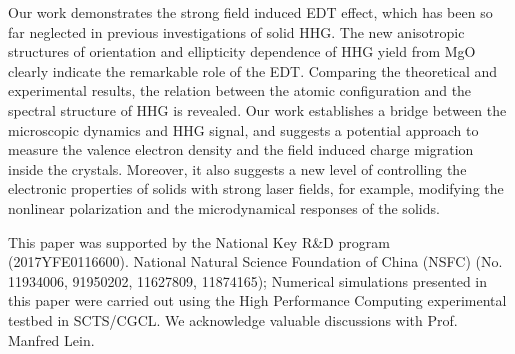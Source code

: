 \documentclass[aps,prl,10pt,preprint,nofootinbib]{revtex4-1}
\begin{document}
Our work demonstrates the strong field induced EDT effect, which has been so far neglected in previous investigations of solid HHG. The new anisotropic structures of orientation and ellipticity dependence of HHG yield from MgO clearly indicate the remarkable role of the EDT. Comparing the theoretical and experimental results, the relation between the atomic configuration and the spectral structure of HHG is revealed. Our work establishes a bridge between the microscopic  dynamics and HHG signal, and suggests a potential approach to measure the valence electron density and the field induced charge migration inside the crystals. Moreover, it also suggests a new level of controlling the electronic properties of solids with strong laser fields, for example, modifying the nonlinear polarization and the microdynamical responses of the solids. 

This paper was supported by the National Key R\&D
program (2017YFE0116600). National Natural
Science Foundation of China (NSFC) (No. 11934006, 91950202, 11627809, 11874165); Numerical simulations presented
in this paper were carried out using the High Performance
Computing experimental testbed in SCTS/CGCL. We acknowledge valuable discussions with Prof. Manfred Lein.
\end{document}
